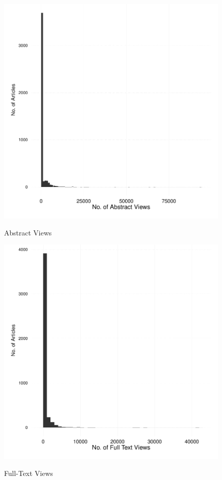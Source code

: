 \documentclass[11pt]{article}
\begin{document}
\begin{figure}[htbp]
\centering
\caption{Abstract Views}
\includegraphics[scale=.85]{../figs/abstract_views.pdf}
\label{fig:abstracts}
\end{figure}

\begin{figure}[htbp]
\centering
\caption{Full-Text Views}
\includegraphics[scale=.85]{../figs/fulltext_views.pdf}
\label{fig:fulltext}
\end{figure}
\end{document}
